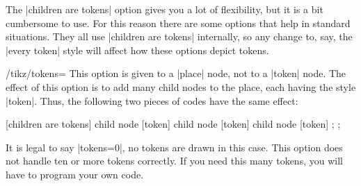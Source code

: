 The |children are tokens| option gives you a lot of flexibility, but
it is a bit cumbersome to use. For this reason there are some options
that help in standard situations. They all use |children are tokens|
internally, so any change to, say, the |every token| style will
affect how these options depict tokens.

\begin{key}{/tikz/tokens=}
  This option is given to a |place| node, not to a |token| node. The
  effect of this option is to add  many child nodes to
  the place, each having the style |token|. Thus, the following two
  pieces of codes have the same effect:
\begin{codeexample}[]
\tikz
  \node[place] {}
  [children are tokens]
  child {node [token] {}}
  child {node [token] {}}
  child {node [token] {}};
\tikz
  \node[place,tokens=3] {};
\end{codeexample}
  It is legal to say |tokens=0|, no tokens are drawn in this
  case. This option does not handle ten or more tokens correctly. If
  you need this many tokens, you will have to program your own code.
\begin{codeexample}[]
\end{codeexample}
\end{key}

